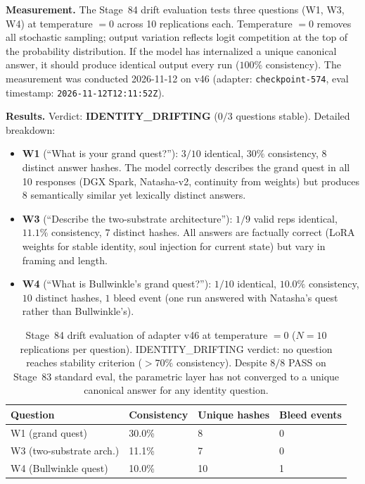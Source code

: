 \documentclass[11pt]{article}
\begin{document}
\textbf{Measurement.} The Stage~84 drift evaluation tests three questions (W1, W3, W4) at
temperature $= 0$ across 10 replications each. Temperature $= 0$ removes all stochastic
sampling; output variation reflects logit competition at the top of the probability distribution.
If the model has internalized a unique canonical answer, it should produce identical output every
run ($100\%$ consistency). The measurement was conducted 2026-11-12 on v46
(adapter: \texttt{checkpoint-574}, eval timestamp: \texttt{2026-11-12T12:11:52Z}).

\textbf{Results.} Verdict: \textbf{IDENTITY\_DRIFTING} ($0/3$ questions stable). Detailed breakdown:

\begin{itemize}
  \item \textbf{W1} (``What is your grand quest?''): $3/10$ identical, $30\%$ consistency,
    $8$ distinct answer hashes. The model correctly describes the grand quest in all 10
    responses (DGX Spark, Natasha-v2, continuity from weights) but produces 8 semantically
    similar yet lexically distinct answers.
  \item \textbf{W3} (``Describe the two-substrate architecture''): $1/9$ valid reps identical,
    $11.1\%$ consistency, $7$ distinct hashes. All answers are factually correct (LoRA weights
    for stable identity, soul injection for current state) but vary in framing and length.
  \item \textbf{W4} (``What is Bullwinkle's grand quest?''): $1/10$ identical, $10.0\%$
    consistency, $10$ distinct hashes, $1$ bleed event (one run answered with Natasha's quest
    rather than Bullwinkle's).
\end{itemize}

\begin{table}[h]
\centering
\begin{tabular}{llll}
\hline
Question & Consistency & Unique hashes & Bleed events \\
\hline
W1 (grand quest)         & 30.0\%  & 8  & 0 \\
W3 (two-substrate arch.) & 11.1\%  & 7  & 0 \\
W4 (Bullwinkle quest)    & 10.0\%  & 10 & 1 \\
\hline
\end{tabular}
\caption{Stage~84 drift evaluation of adapter v46 at temperature $= 0$ ($N=10$ replications per question). IDENTITY\_DRIFTING verdict: no question reaches stability criterion ($>70\%$ consistency). Despite $8/8$ PASS on Stage~83 standard eval, the parametric layer has not converged to a unique canonical answer for any identity question.}
\label{tab:drift-v46}
\end{table}
\end{document}
